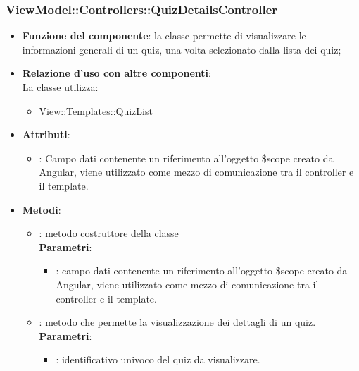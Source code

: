 \subsubsection{ViewModel::Controllers::QuizDetailsController}
\begin{itemize}
\item\textbf{Funzione del componente}: la classe permette di visualizzare le informazioni generali di un quiz, una volta selezionato dalla lista dei quiz;
	\item\textbf{Relazione d'uso con altre componenti}: \\
La classe utilizza:
	\begin{itemize}
		\item View::Templates::QuizList
	\end{itemize}
\item\textbf{Attributi}:
	\begin{itemize}
		\item{}: Campo dati contenente un riferimento all'oggetto \$scope creato da Angular, viene utilizzato come mezzo di comunicazione tra il controller e il template.\\
	\end{itemize}
\item\textbf{Metodi}:
	\begin{itemize}
		\item{}: metodo costruttore della classe\\
		\textbf{Parametri}:
			\begin{itemize}
				\item{}: campo dati contenente un riferimento all’oggetto \$scope creato da Angular, viene utilizzato come mezzo di comunicazione tra il controller e il template.\\
			\end{itemize}
		\item{}: metodo che permette la visualizzazione dei dettagli di un quiz.\\
		\textbf{Parametri}:
			\begin{itemize}
				\item{}: identificativo univoco del quiz da visualizzare.\\
			\end{itemize}
	\end{itemize}
\end{itemize}

